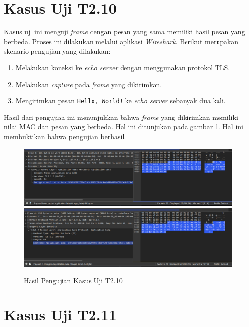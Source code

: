 \section{Kasus Uji T2.10}

Kasus uji ini menguji \emph{frame} dengan pesan yang sama memiliki hasil pesan yang berbeda. Proses ini dilakukan melalui aplikasi \emph{Wireshark}. Berikut merupakan skenario pengujian yang dilakukan:

\begin{enumerate}
  \item Melakukan koneksi ke \emph{echo server} dengan menggunakan protokol TLS.
  \item Melakukan \emph{capture} pada \emph{frame} yang dikirimkan.
  \item Mengirimkan pesan \texttt{Hello, World!} ke \emph{echo server} sebanyak dua kali.
\end{enumerate}

Hasil dari pengujian ini menunjukkan bahwa \emph{frame} yang dikirimkan memiliki nilai MAC dan pesan yang berbeda. Hal ini ditunjukan pada gambar \ref{fig:unit.test.t2.10}. Hal ini membuktikan bahwa pengujian berhasil.

\begin{figure}[ht]
  \centering
  \includegraphics[width=\textwidth]{chapters/res/appendix-4/2.10.1.png}
  \includegraphics[width=\textwidth]{chapters/res/appendix-4/2.10.2.png}
  \caption{Hasil Pengujian Kasus Uji T2.10}
  \label{fig:unit.test.t2.10}
\end{figure}

\section{Kasus Uji T2.11}

